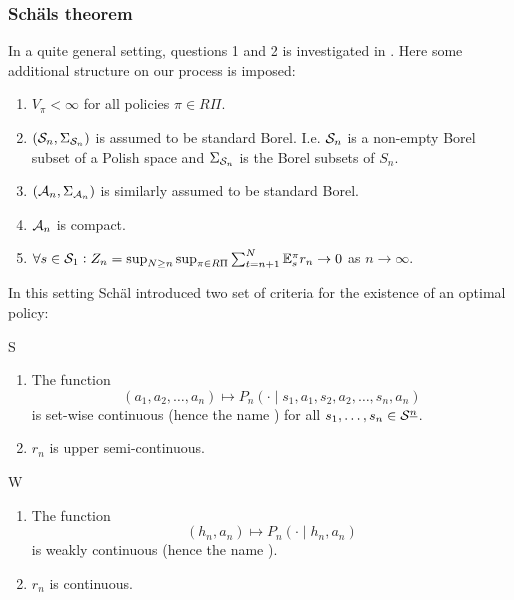 \subsubsection{Schäls theorem}
In a quite general setting, questions 1 and 2
is investigated in .
Here some additional structure on our process is imposed:
\begin{sett}[Schäl]
  \begin{enumerate}
    \item $V_\pi < \infty$ for all policies $\pi \in R\Pi$.
    \item $(\mathcal{S}_n, \Sigma_{\mathcal{S}_n})$ is assumed to be standard Borel.
      I.e. $\mathcal{S}_n$ is a non-empty Borel subset of a Polish space
      and $\Sigma_{\mathcal{S}_n}$ is the Borel subsets of $S_n$.
    \item $(\mathcal{A}_n, \Sigma_{\mathcal{A}_n})$ is similarly assumed to be
      standard Borel.
    \item $\mathcal{A}_n$ is compact.
    \item $\forall s \in \mathcal{S}_1 :
      Z_n = \sup_{N \geq n} \sup_{\pi \in R\Pi} \sum_{t=n+1}^N
      \mathbb{E}_s^\pi r_n \to 0$ as $n \to \infty$.
  \end{enumerate}
  \label{sett:Schal}
\end{sett}

In this setting Schäl introduced two set of criteria for the existence
of an optimal policy:

\begin{cond}{S}
  \begin{enumerate}
    \item The function \[
	(a_1, a_2, \dots, a_n) \mapsto
	P_n(\cdot \mid s_1, a_1, s_2, a_2, \dots, s_n, a_n)
      \]
      is set-wise continuous (hence the name )
      for all $s_1, \dots, s_n \in \mathcal{S}^{\underline{n}}$.
    \item $r_n$ is upper semi-continuous.
  \end{enumerate}
  \label{cond:S}
\end{cond}

\begin{cond}{W}
  \begin{enumerate}
    \item The function
      \[(h_n, a_n) \mapsto P_n(\cdot \mid h_n, a_n)\]
	is weakly continuous (hence the name ).
    \item $r_n$ is continuous.
  \end{enumerate}
  \label{cond:W}
\end{cond}

